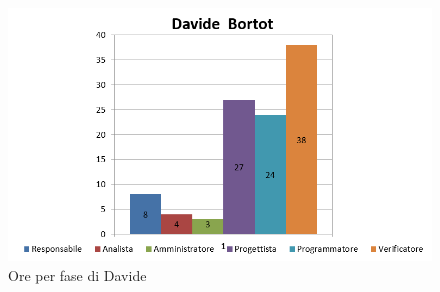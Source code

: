 \documentclass[a4paper,11pt]{article}
\begin{document}
	
	\begin{figure}[h!]
		\centering
		\includegraphics[scale=0.7]{../Images/ore_per_ruolo_Davide.png}
	\caption{ Ore per fase di Davide }
	\end{figure}
	
\end{document}

